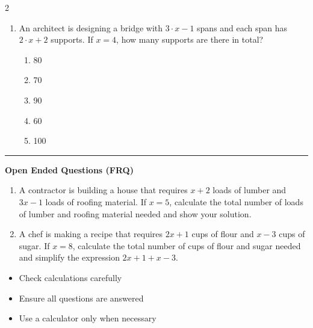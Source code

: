 \documentclass[10pt]{article}
\begin{document}
\begin{multicols}{2}
\begin{enumerate}[label=\textbf{Q\arabic*.}, leftmargin=*, itemsep=6pt, parsep=0pt]
  \item \small An architect is designing a bridge with $3 \cdot x - 1$ spans and each span has $2 \cdot x + 2$ supports. If $x = 4$, how many supports are there in total?
  \begin{enumerate}[label=(\Alph*), leftmargin=0.6cm, nosep, itemsep=2pt]
    \item 80
    \item 70
    \item 90
    \item 60
    \item 100
  \end{enumerate}

\end{enumerate}
\end{multicols}

\vspace{-0.2cm}
\hrule
\vspace{0.2cm}
\textbf{\small Open Ended Questions (FRQ)}
\begin{enumerate}[label=\textbf{Q\arabic*.}, start=9, itemsep=5pt, topsep=0pt]

  \item \small A contractor is building a house that requires $x + 2$ loads of lumber and $3x - 1$ loads of roofing material. If $x = 5$, calculate the total number of loads of lumber and roofing material needed and show your solution. \vspace{2cm}

  \item \small A chef is making a recipe that requires $2x + 1$ cups of flour and $x - 3$ cups of sugar. If $x = 8$, calculate the total number of cups of flour and sugar needed and simplify the expression $2x + 1 + x - 3$. \vspace{2cm}

\end{enumerate}

\vfill

\begin{tcolorbox}[colback=blue!5, colframe=mainblue!50, title=\small \textbf{Chef's Tips}, fonttitle=\bfseries, bottom=1mm]
\begin{itemize}[noitemsep, topsep=2pt, leftmargin=0.5cm]
  \item \scriptsize Check calculations carefully\item \scriptsize Ensure all questions are answered\item \scriptsize Use a calculator only when necessary
\end{itemize}
\end{tcolorbox}
\end{document}
